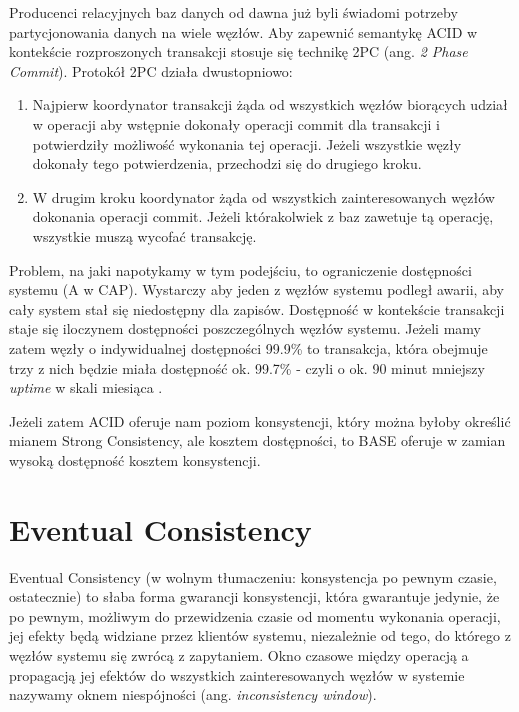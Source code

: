 Producenci relacyjnych baz danych od dawna już byli świadomi potrzeby partycjonowania danych na wiele węzłów.
Aby zapewnić semantykę ACID w kontekście rozproszonych transakcji stosuje się technikę 2PC (ang. \emph{2 Phase Commit}).
Protokół 2PC działa dwustopniowo:

\begin{enumerate}
 \item Najpierw koordynator transakcji żąda od wszystkich węzłów biorących udział w operacji aby wstępnie dokonały operacji commit dla transakcji i potwierdziły możliwość wykonania tej operacji.
 Jeżeli wszystkie węzły dokonały tego potwierdzenia, przechodzi się do drugiego kroku.
 \item W drugim kroku koordynator żąda od wszystkich zainteresowanych węzłów dokonania operacji commit.
 Jeżeli którakolwiek z baz zawetuje tą operację, wszystkie muszą wycofać transakcję.
\end{enumerate}

Problem, na jaki napotykamy w tym podejściu, to ograniczenie dostępności systemu (A w CAP).
Wystarczy aby jeden z węzłów systemu podległ awarii, aby cały system stał się niedostępny dla zapisów.
Dostępność w kontekście transakcji staje się iloczynem dostępności poszczególnych węzłów systemu.
Jeżeli mamy zatem węzły o indywidualnej dostępności 99.9\% to transakcja, która obejmuje trzy z nich będzie miała dostępność ok. 99.7\% - czyli o ok. 90 minut mniejszy \emph{uptime} w skali miesiąca \cite{base-an-acid-alternative}.

Jeżeli zatem ACID oferuje nam poziom konsystencji, który można byłoby określić mianem Strong Consistency, ale kosztem dostępności, to BASE oferuje w zamian wysoką dostępność kosztem konsystencji. 

\section{Eventual Consistency}

Eventual Consistency (w wolnym tłumaczeniu: konsystencja po pewnym czasie, ostatecznie) to słaba forma gwarancji konsystencji, która gwarantuje jedynie, że po pewnym, możliwym do przewidzenia czasie od momentu wykonania operacji, jej efekty będą widziane przez klientów systemu, niezależnie od tego, do którego z węzłów systemu się zwrócą z zapytaniem.
Okno czasowe między operacją a propagacją jej efektów do wszystkich zainteresowanych węzłów w systemie nazywamy oknem niespójności (ang. \emph{inconsistency window}).

